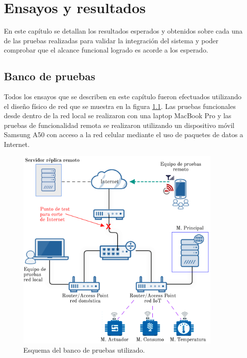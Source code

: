 
\chapter{Ensayos y resultados} %

\label{Chapter4} %


En este capítulo se detallan los resultados esperados y obtenidos sobre cada una de las pruebas realizadas para validar la integración del sistema y poder comprobar que el alcance funcional logrado es acorde a los esperado.


\section{Banco de pruebas}

Todos los ensayos que se describen en este capítulo fueron efectuados utilizando el diseño físico de red que se muestra en la figura \ref{fig:banco}. Las pruebas funcionales desde dentro de la red local se realizaron con una laptop MacBook Pro y las pruebas de funcionalidad remota se realizaron utilizando un dispositivo móvil Samsung A50 con acceso a la red celular mediante el uso de paquetes de datos a Internet.

\begin{figure}[htbp]
	\centering
	\includegraphics[width=0.91\textwidth]{./Figures/banco2.png}
	\caption{Esquema del banco de pruebas utilizado.}

	\label{fig:banco}
\end{figure}


